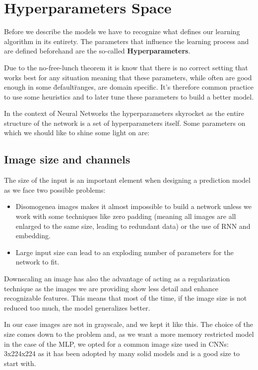 \newpage


\section{Hyperparameters Space}
\label{sec:hyperparameters-space}

Before we describe the models we have to recognize what defines our learning algorithm in its entirety.
The parameters that influence the learning process and are defined beforehand are the so-called \textbf{Hyperparameters}.

Due to the no-free-lunch theorem it is know that there is no correct setting that works best for any situation meaning
that these parameters, while often are good enough in some \"default\" ranges, are domain specific.
It's therefore common practice to use some heuristics and to later tune these parameters to build a better model.

In the context of Neural Networks the hyperparameters skyrocket as the entire structure of the network
is a set of hyperparameters itself. Some parameters on which we should like to shine some light on are:

\subsection{Image size and channels}
\label{subsec:image-size-and-channels}
The size of the input is an important element when designing a prediction model as we face two possible problems:
\begin{itemize}
    \item Disomogenea images makes it almost impossible to build a network unless we work with some techniques like
    zero padding (meaning all images are all enlarged to the same size, leading to redundant data) or the use of RNN and embedding. %
    \item Large input size can lead to an exploding number of parameters for the network to fit.
\end{itemize}

Downscaling an image has also the advantage of acting as a regularization technique as the images we are providing
show less detail and enhance recognizable features.
This means that most of the time, if the image size is not reduced too much, the model generalizes better.

In our case images are not in grayscale, and we kept it like this.
The choice of the size comes down to the problem and, as we want a more memory restricted model in the case of the MLP,
we opted for a common image size used in CNNs: 3x224x224 as it has been adopted by many solid models and is a good size to start with.

